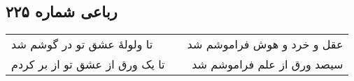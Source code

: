 \begin{center}
\section*{رباعی شماره ۲۲۵}
\label{sec:sh225}
\begin{longtable}{l p{0.5cm} r}
تا ولولهٔ عشق تو در گوشم شد
&&
عقل و خرد و هوش فراموشم شد
\\
تا یک ورق از عشق تو از بر کردم
&&
سیصد ورق از علم فراموشم شد
\\
\end{longtable}
\end{center}

